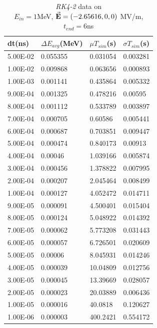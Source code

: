 \documentclass[a4paper,oneside,12pt]{report}
\numberwithin{equation}{chapter}
\begin{document}
\begin{table}[H]
    \centering
    \begin{tabular}{|l|l|l|l|}
    \hline
    dt(ns)       & $\Delta E_{avg}$(MeV) & $\mu T_{sim}$(s)    & $\sigma T_{sim}$(s) \\\hline
        5.00E-02 & 0.055355     & 0.031054 & 0.003281 \\\hline
        1.00E-02 & 0.009868     & 0.063656 & 0.000893 \\\hline
        1.00E-03 & 0.001141     & 0.435864 & 0.005332 \\\hline
        9.00E-04 & 0.001325     & 0.478216 & 0.00595  \\\hline
        8.00E-04 & 0.001112     & 0.533789 & 0.003897 \\\hline
        7.00E-04 & 0.000705     & 0.60586  & 0.005441 \\\hline
        6.00E-04 & 0.000687     & 0.703851 & 0.009447 \\\hline
        5.00E-04 & 0.000474     & 0.840173 & 0.00913  \\\hline
        4.00E-04 & 0.00046      & 1.039166 & 0.005874 \\\hline
        3.00E-04 & 0.000456     & 1.378822 & 0.007995 \\\hline
        2.00E-04 & 0.000207     & 2.045464 & 0.008499 \\\hline
        1.00E-04 & 0.000127     & 4.052472 & 0.014711 \\\hline
        9.00E-05 & 0.000091     & 4.500401 & 0.015404 \\\hline
        8.00E-05 & 0.000124     & 5.048922 & 0.014392 \\\hline
        7.00E-05 & 0.000062     & 5.773208 & 0.031443 \\\hline
        6.00E-05 & 0.000057     & 6.726501 & 0.020609 \\\hline
        5.00E-05 & 0.00006      & 8.045931 & 0.014246 \\\hline
        4.00E-05 & 0.000039     & 10.04809 & 0.012756 \\\hline
        3.00E-05 & 0.000045     & 13.39669 & 0.028057 \\\hline
        2.00E-05 & 0.000023     & 20.03889 & 0.006436 \\\hline
        1.00E-05 & 0.000016     & 40.0818  & 0.120627 \\\hline
        1.00E-06 & 0.000003     & 400.2421 & 0.554172 \\\hline 
    \end{tabular}
    \caption{\textit{RK4-2} data on \\$E_{in}=1$MeV, $\vec{\textbf{E}}=(-2.65616, 0, 0)$ MV/m, $t_{end}=6$ns}
    \label{tab:rk2_statE_table}
\end{table}
\end{document}
